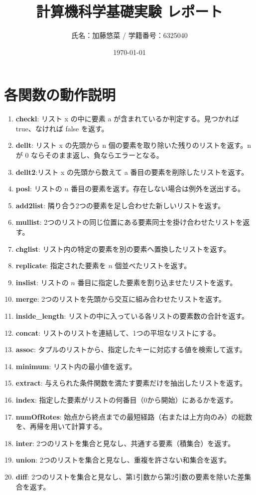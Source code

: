 \documentclass[titlepage]{ltjsarticle}
\title{計算機科学基礎実験 レポート}
\author{氏名：加藤悠菜 / 学籍番号：6325040}
\date{\today}
\begin{document}
\maketitle

\section{各関数の動作説明}

\begin{enumerate}
    \item \textbf{checkl}: リスト x の中に要素 a が含まれているか判定する。見つかれば true、なければ false を返す。
    \item \textbf{dellt}: リスト x の先頭から n 個の要素を取り除いた残りのリストを返す。n が 0 ならそのまま返し、負ならエラーとなる。
    \item \textbf{dellt2}:リスト x の先頭から数えて a 番目の要素を削除したリストを返す。
    \item \textbf{posl}: リストの $n$ 番目の要素を返す。存在しない場合は例外を送出する。
    \item \textbf{add2list}: 隣り合う2つの要素を足し合わせた新しいリストを返す。
    \item \textbf{mullist}: 2つのリストの同じ位置にある要素同士を掛け合わせたリストを返す。
    \item \textbf{chglist}: リスト内の特定の要素を別の要素へ置換したリストを返す。
    \item \textbf{replicate}: 指定された要素を $n$ 個並べたリストを返す。
    \item \textbf{inslist}: リストの $n$ 番目に指定した要素を割り込ませたリストを返す。
    \item \textbf{merge}: 2つのリストを先頭から交互に組み合わせたリストを返す。
    \item \textbf{inside\_length}: リストの中に入っている各リストの要素数の合計を返す。
    \item \textbf{concat}: リストのリストを連結して、1つの平坦なリストにする。
    \item \textbf{assoc}: タプルのリストから、指定したキーに対応する値を検索して返す。
    \item \textbf{minimum}: リスト内の最小値を返す。
    \item \textbf{extract}: 与えられた条件関数を満たす要素だけを抽出したリストを返す。
    \item \textbf{index}: 指定した要素がリストの何番目（0から開始）にあるかを返す。
    \item \textbf{numOfRotes}: 始点から終点までの最短経路（右または上方向のみ）の総数を、再帰を用いて計算する。
    \item \textbf{inter}: 2つのリストを集合と見なし、共通する要素（積集合）を返す。
    \item \textbf{union}: 2つのリストを集合と見なし、重複を許さない和集合を返す。
    \item \textbf{diff}: 2つのリストを集合と見なし、第1引数から第2引数の要素を除いた差集合を返す。
\end{enumerate}
\end{document}
